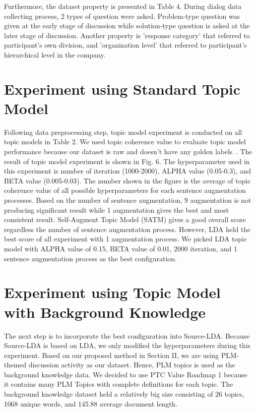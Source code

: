 \documentclass[senior]{IPSstyle}
\begin{document}
Furthermore, the dataset property is presented in Table 4. During dialog data collecting process, 2 types of question were asked. Problem-type question was given at the early stage of discussion while solution-type question is asked at the later stage of discussion. Another property is ’response category’ that referred to participant’s own division, and ’organization level’ that referred to participant’s hierarchical level in the company.

\section{Experiment using Standard Topic Model}

Following data preprocessing step, topic model experiment is conducted on all topic models in Table 2. We used topic coherence value to evaluate topic model performance because our dataset is raw and doesn’t have any golden labels~\cite{qiang}. The result of topic model experiment is shown in Fig. 6. The hyperparameter used in this experiment is number of iteration (1000-2000), ALPHA value (0.05-0.3), and BETA value (0.005-0.03). The number shown in the figure is the average of topic coherence value of all possible hyperparameters for each sentence augmentation processes. Based on the number of sentence augmentation, 9 augmentation is not producing significant result while 1 augmentation gives the best and most consistent result. Self-Augment Topic Model (SATM) gives a good overall score regardless the number of sentence augmentation process. However, LDA held the best score of all experiment with 1 augmentation process. We picked LDA topic model with ALPHA value of 0.15, BETA value of 0.01, 2000 iteration, and 1 sentence augmentation process as the best configuration.

\section{Experiment using Topic Model with Background Knowledge}

The next step is to incorporate the best configuration into Source-LDA. Because Source-LDA is based on LDA, we only modified the hyperparameters during this experiment. Based on our proposed method in Section II, we are using PLM-themed discussion activity as our dataset. Hence, PLM topics is used as the background knowledge data. We decided to use PTC Value Roadmap 1 because it contains many PLM Topics with complete definitions for each topic. The background knowledge dataset held a relatively big size consisting of 26 topics, 1068 unique words, and 145.88 average document length.
\end{document}
